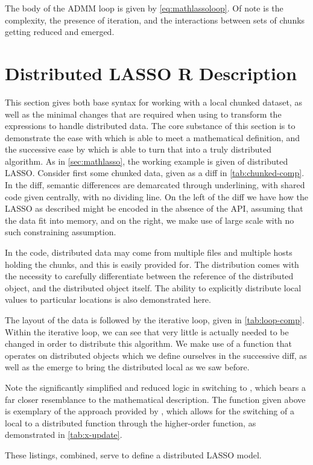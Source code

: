 The body of the ADMM loop is given by \cref{eq:mathlassoloop}.
Of note is the complexity, the presence of iteration, and the interactions between sets of chunks getting reduced and emerged.


\section{Distributed LASSO R Description}\label{sec:rlasso}

This section gives both base \R{} syntax for working with a local chunked dataset, as well as the minimal changes that are required when using \lsr{} to transform the expressions to handle distributed data.
The core substance of this section is to demonstrate the ease with which \R{} is able to meet a mathematical definition, and the successive ease by which \lsr{} is able to turn that into a truly distributed algorithm.
As in \cref{sec:mathlasso}, the working example is given of distributed LASSO.
Consider first some chunked data, given as a diff in \cref{tab:chunked-comp}.
In the diff, semantic differences are demarcated through underlining, with shared code given centrally, with no dividing line.
On the left of the diff we have how the LASSO as described might be encoded in the absence of the API, assuming that the data fit into memory, and on the right, we make use of large scale \R{} with no such constraining assumption.

In the \lsr{} code, distributed data may come from multiple files and multiple hosts holding the chunks, and this is easily provided for.
The distribution comes with the necessity to carefully differentiate between the reference of the distributed object, and the distributed object itself.
The ability to explicitly distribute local values to particular locations is also demonstrated here.


The layout of the data is followed by the iterative loop, given in \cref{tab:loop-comp}.
Within the iterative loop, we can see that very little is actually needed to be changed in order to distribute this algorithm.
We make use of a function that operates on distributed objects which we define ourselves in the successive diff, as well as the emerge to bring the distributed local as we saw before.


Note the significantly simplified and reduced logic in switching to \lsr{}, which bears a far closer resemblance to the mathematical description.
The  function given above is exemplary of the approach provided by \lsr{}, which allows for the switching of a local to a distributed function through the higher-order  function, as demonstrated in \cref{tab:x-update}.


These listings, combined, serve to define a distributed LASSO model.
